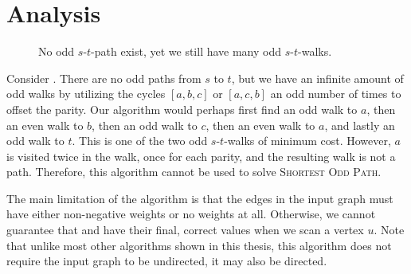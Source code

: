 \section{Analysis}

\begin{figure}
    \centering
    \caption{No odd $s$-$t$-path exist, yet we still have many odd $s$-$t$-walks.}
    \label{figure:small2}
 \end{figure}

Consider . There are no odd paths from $s$ to $t$, but we have an infinite amount of odd walks by utilizing the cycles $[a,b,c]$ or $[a,c,b]$ an odd number of times to offset the parity. Our algorithm would perhaps first find an odd walk to $a$, then an even walk to $b$, then an odd walk to $c$, then an even walk to $a$, and lastly an odd walk to $t$. This is one of the two odd $s$-$t$-walks of minimum cost. However, $a$ is visited twice in the walk, once for each parity, and the resulting walk is not a path. Therefore, this algorithm cannot be used to solve \textsc{Shortest Odd Path}.

The main limitation of the algorithm is that the edges in the input graph must have either non-negative weights or no weights at all. Otherwise, we cannot guarantee that  and  have their final, correct values when we scan a vertex $u$. Note that unlike most other algorithms shown in this thesis, this algorithm does not require the input graph to be undirected, it may also be directed.

